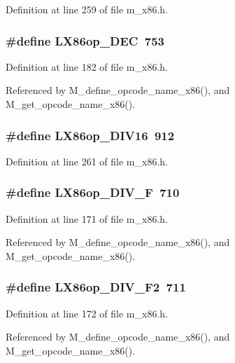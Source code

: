 Definition at line 259 of file m\_\-x86.h.
\subsubsection{\setlength{\rightskip}{0pt plus 5cm}\#define LX86op\_\-DEC~753}\label{m__x86_8h_18627c5845c0d3f5c31ec7e2b74d9f43}




Definition at line 182 of file m\_\-x86.h.

Referenced by M\_\-define\_\-opcode\_\-name\_\-x86(), and M\_\-get\_\-opcode\_\-name\_\-x86().
\subsubsection{\setlength{\rightskip}{0pt plus 5cm}\#define LX86op\_\-DIV16~912}\label{m__x86_8h_9839d4bf6c559dbadcc8f0d46f85094e}




Definition at line 261 of file m\_\-x86.h.
\subsubsection{\setlength{\rightskip}{0pt plus 5cm}\#define LX86op\_\-DIV\_\-F~710}\label{m__x86_8h_875fd330e08cd4d16648eeb0d2d6bfda}




Definition at line 171 of file m\_\-x86.h.

Referenced by M\_\-define\_\-opcode\_\-name\_\-x86(), and M\_\-get\_\-opcode\_\-name\_\-x86().
\subsubsection{\setlength{\rightskip}{0pt plus 5cm}\#define LX86op\_\-DIV\_\-F2~711}\label{m__x86_8h_5a3cee6367819a99ac9daff6a23c888f}




Definition at line 172 of file m\_\-x86.h.

Referenced by M\_\-define\_\-opcode\_\-name\_\-x86(), and M\_\-get\_\-opcode\_\-name\_\-x86().
